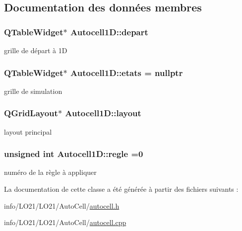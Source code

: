 \subsection{Documentation des données membres}
\subsubsection[{\texorpdfstring{depart}{depart}}]{\setlength{\rightskip}{0pt plus 5cm}Q\+Table\+Widget$\ast$ Autocell1\+D\+::depart\hspace{0.3cm}{\ttfamily [protected]}}\hypertarget{class_autocell1_d_a7bd65a39691f86e179bcb0466e7e38c2}{}\label{class_autocell1_d_a7bd65a39691f86e179bcb0466e7e38c2}
grille de départ à 1D 
\subsubsection[{\texorpdfstring{etats}{etats}}]{\setlength{\rightskip}{0pt plus 5cm}Q\+Table\+Widget$\ast$ Autocell1\+D\+::etats = nullptr\hspace{0.3cm}{\ttfamily [protected]}}\hypertarget{class_autocell1_d_aed4038c48d9cc0a841e6f565d4cd792c}{}\label{class_autocell1_d_aed4038c48d9cc0a841e6f565d4cd792c}
grille de simulation 
\subsubsection[{\texorpdfstring{layout}{layout}}]{\setlength{\rightskip}{0pt plus 5cm}Q\+Grid\+Layout$\ast$ Autocell1\+D\+::layout\hspace{0.3cm}{\ttfamily [protected]}}\hypertarget{class_autocell1_d_a7934db954892dc0efc12a961686a75c0}{}\label{class_autocell1_d_a7934db954892dc0efc12a961686a75c0}
layout principal 
\subsubsection[{\texorpdfstring{regle}{regle}}]{\setlength{\rightskip}{0pt plus 5cm}unsigned int Autocell1\+D\+::regle =0\hspace{0.3cm}{\ttfamily [protected]}}\hypertarget{class_autocell1_d_ae28c4a70102bd5e08a2414d27b20bb47}{}\label{class_autocell1_d_ae28c4a70102bd5e08a2414d27b20bb47}
numéro de la règle à appliquer 

La documentation de cette classe a été générée à partir des fichiers suivants \+:\begin{DoxyCompactItemize}
\item 
info/\+L\+O21/\+L\+O21/\+Auto\+Cell/\hyperlink{autocell_8h}{autocell.\+h}\item 
info/\+L\+O21/\+L\+O21/\+Auto\+Cell/\hyperlink{autocell_8cpp}{autocell.\+cpp}\end{DoxyCompactItemize}
